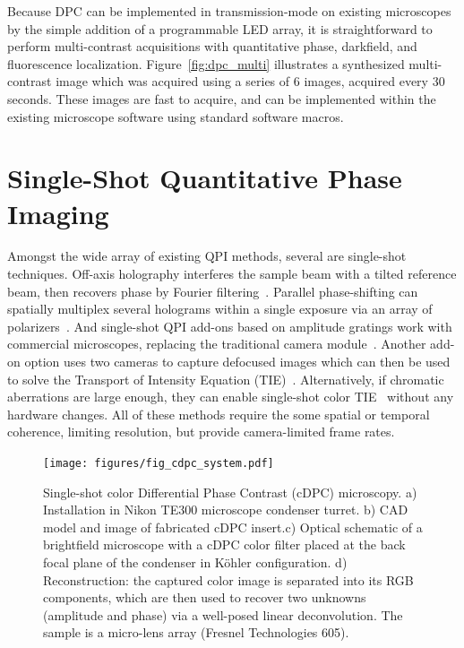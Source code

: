 Because DPC can be implemented in transmission-mode on existing microscopes by the simple addition of a programmable LED array, it is straightforward to perform multi-contrast acquisitions with quantitative phase, darkfield, and fluorescence localization. Figure~\ref{fig:dpc_multi} illustrates a synthesized multi-contrast image which was acquired using a series of 6 images, acquired every 30 seconds. These images are fast to acquire, and can be implemented within the existing microscope software using standard software macros.

\section{Single-Shot Quantitative Phase Imaging}\label{sec:phase:cdpc}
Amongst the wide array of existing QPI methods, several are single-shot techniques. Off-axis holography interferes the sample beam with a tilted reference beam, then recovers phase by Fourier filtering~\cite{Witte:12}. Parallel phase-shifting can spatially multiplex several holograms within a single exposure via an array of polarizers~\cite{2004singleshotPSDH}. And single-shot QPI add-ons based on amplitude gratings work with commercial microscopes, replacing the traditional camera module~\cite{phasics,bon2012method}. Another add-on option uses two cameras to capture defocused images which can then be used to solve the Transport of Intensity Equation (TIE)~\cite{allman2005optical}. Alternatively, if chromatic aberrations are large enough, they can enable single-shot color TIE~\cite{gross:14} without any hardware changes. All of these methods require the some spatial or temporal coherence, limiting resolution, but provide camera-limited frame rates.

\begin{figure}[tbh]
\centering
\texttt{[image: figures/fig\_cdpc\_system.pdf]}
\caption{\label{fig:dpc_cdpchardware}
Single-shot color Differential Phase Contrast (cDPC) microscopy. a) Installation in Nikon TE300 microscope condenser turret. b) CAD model and image of fabricated cDPC insert.c) Optical schematic of a brightfield microscope with a cDPC color filter placed at the back focal plane of the condenser in K\"{o}hler configuration. d) Reconstruction: the captured color image is separated into its RGB components, which are then used to recover two unknowns (amplitude and phase) via a well-posed linear deconvolution. The sample is a micro-lens array (Fresnel Technologies 605). }
\end{figure}

